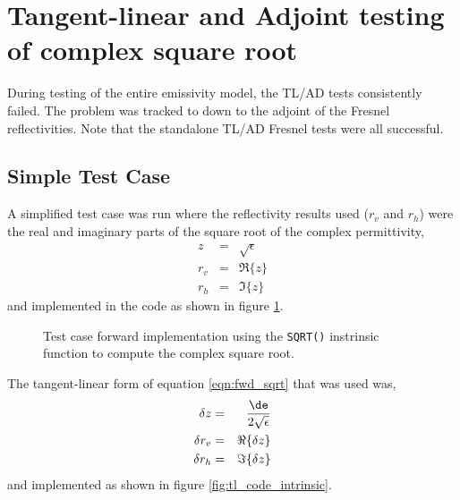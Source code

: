 \section{Tangent-linear and Adjoint testing of complex square root}

During testing of the entire emissivity model, the TL/AD tests consistently failed. The problem was tracked to down to the adjoint of the Fresnel reflectivities. Note that the standalone TL/AD Fresnel tests were all successful. 

\subsection{Simple Test Case}
A simplified test case was run where the reflectivity results used ($r_v$ and $r_h$) were the real and imaginary parts of the square root of the complex permittivity,
\begin{eqnarray}
  z &=& \sqrt{\epsilon}\nonumber\\
  r_v &=& \Re\{z\}\label{eqn:fwd_sqrt}\\
  r_h &=& \Im\{z\}\nonumber
\end{eqnarray}
and implemented in the code as shown in figure \ref{fig:fwd_code_intrinsic}.

\begin{figure}[htp]
  \centering
  \caption{Test case forward implementation using the \texttt{SQRT()} instrinsic function to compute the complex square root.}
  \label{fig:fwd_code_intrinsic}
\end{figure}

The tangent-linear form of equation \ref{eqn:fwd_sqrt} that was used was,
\begin{eqnarray}
  \delta{z} &=& \frac{\de}{2\sqrt{\epsilon}}\nonumber\\
  \delta{r_v} &=& \Re\{\delta{z}\}\label{eqn:tl_sqrt}\\
  \delta{r_h} &=& \Im\{\delta{z}\}\nonumber
\end{eqnarray}
and implemented as shown in figure \ref{fig:tl_code_intrinsic}.

